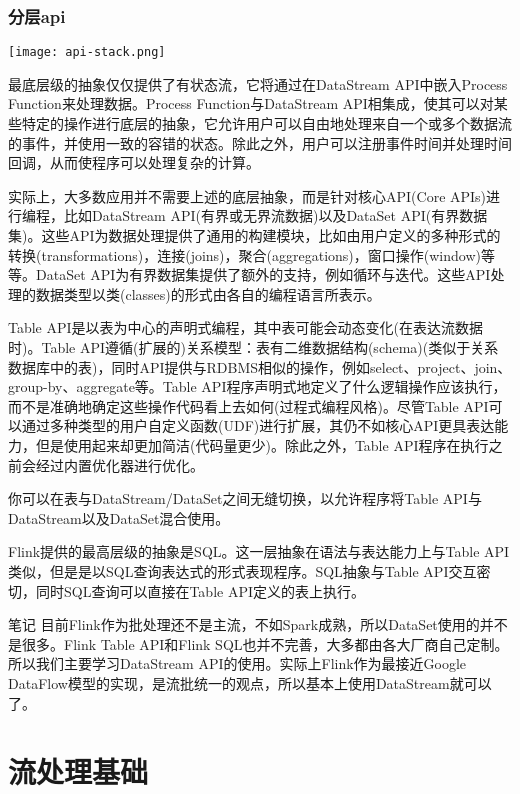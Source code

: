 \documentclass[oneside]{ctexbook}
\begin{document}
\subsection{分层api}

\noindent \texttt{[image: api-stack.png]}

最底层级的抽象仅仅提供了有状态流，它将通过在DataStream API中嵌入Process Function来处理数据。Process Function与DataStream API相集成，使其可以对某些特定的操作进行底层的抽象，它允许用户可以自由地处理来自一个或多个数据流的事件，并使用一致的容错的状态。除此之外，用户可以注册事件时间并处理时间回调，从而使程序可以处理复杂的计算。

实际上，大多数应用并不需要上述的底层抽象，而是针对核心API(Core APIs)进行编程，比如DataStream API(有界或无界流数据)以及DataSet API(有界数据集)。这些API为数据处理提供了通用的构建模块，比如由用户定义的多种形式的转换(transformations)，连接(joins)，聚合(aggregations)，窗口操作(window)等等。DataSet API为有界数据集提供了额外的支持，例如循环与迭代。这些API处理的数据类型以类(classes)的形式由各自的编程语言所表示。

Table API是以表为中心的声明式编程，其中表可能会动态变化(在表达流数据时)。Table API遵循(扩展的)关系模型：表有二维数据结构(schema)(类似于关系数据库中的表)，同时API提供与RDBMS相似的操作，例如select、project、join、group-by、aggregate等。Table API程序声明式地定义了什么逻辑操作应该执行，而不是准确地确定这些操作代码看上去如何(过程式编程风格)。尽管Table API可以通过多种类型的用户自定义函数(UDF)进行扩展，其仍不如核心API更具表达能力，但是使用起来却更加简洁(代码量更少)。除此之外，Table API程序在执行之前会经过内置优化器进行优化。

你可以在表与DataStream/DataSet之间无缝切换，以允许程序将Table API与DataStream以及DataSet混合使用。

Flink提供的最高层级的抽象是SQL。这一层抽象在语法与表达能力上与Table API类似，但是是以SQL查询表达式的形式表现程序。SQL抽象与Table API交互密切，同时SQL查询可以直接在Table API定义的表上执行。

\begin{bclogo}[logo=\bcinfo, couleurBarre=orange, noborder=true, couleur=white]{笔记}
目前Flink作为批处理还不是主流，不如Spark成熟，所以DataSet使用的并不是很多。Flink Table API和Flink SQL也并不完善，大多都由各大厂商自己定制。所以我们主要学习DataStream API的使用。实际上Flink作为最接近Google DataFlow模型的实现，是流批统一的观点，所以基本上使用DataStream就可以了。
\end{bclogo}

\chapter{流处理基础}
\end{document}
